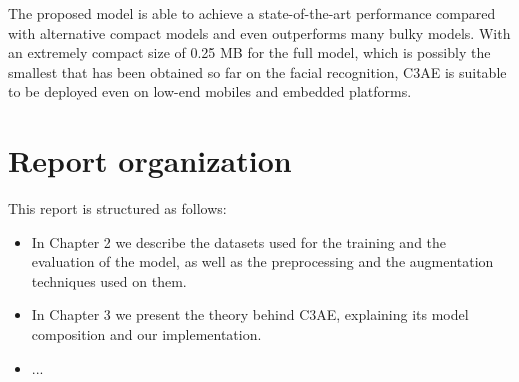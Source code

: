 The proposed model is able to achieve a state-of-the-art performance compared with alternative compact models and even outperforms many 
bulky models. With an extremely compact size of 0.25 MB for the full model, which is possibly the smallest that has been
obtained so far on the facial recognition, C3AE is suitable to be deployed even on low-end mobiles and embedded platforms.

\section{Report organization}
This report is structured as follows:
\begin{itemize}
    \item In Chapter 2 we describe the datasets used for the training and the evaluation of the model, as well as the preprocessing 
      and the augmentation techniques used on them.
    \item In Chapter 3 we present the theory behind C3AE, explaining its model composition and our implementation.
    \item ... 
  \end{itemize}